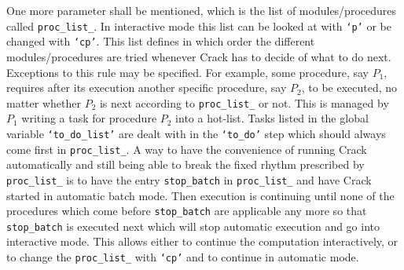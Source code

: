\documentclass[12pt]{article}
\begin{document}
One more parameter shall be mentioned, which is the list of modules/procedures
called {\tt proc\_list\_}. In interactive mode this list can be looked
at with {\tt `p'} or be changed with {\tt `cp'}. This list defines
in which order the different modules/procedures are tried whenever
{\sc Crack} has to decide of what to do next. Exceptions
to this rule may be specified. For example, some procedure, say
$P_1$, requires after its execution another
specific procedure, say $P_2$, to be executed, no  matter whether
$P_2$ is next according to {\tt proc\_list\_} or not. This is managed by $P_1$
writing a task for procedure $P_2$ into a hot-list. Tasks listed in
the global variable {\tt `to\_do\_list'} are 
dealt with in the {\tt `to\_do'} step which should
always come first in {\tt proc\_list\_}. 
A way to have the convenience of running {\sc Crack} automatically
and still being able to break the fixed rhythm prescribed by {\tt
proc\_list\_} is to have the entry {\tt stop\_batch} in {\tt proc\_list\_}
and have {\sc Crack} started in automatic batch mode. Then execution
is continuing 
until none of the procedures which come before {\tt stop\_batch} are
applicable any more so that {\tt stop\_batch} is executed next which will
stop automatic execution and go into interactive mode. This allows
either to continue the computation interactively, or to change the 
{\tt proc\_list\_} with {\tt `cp'} and to continue in automatic mode.
\end{document}
